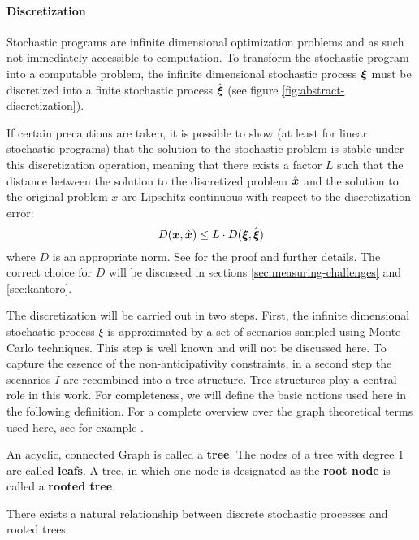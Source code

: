 \paragraph{Discretization}
% 
Stochastic programs are infinite dimensional optimization problems and as such not immediately accessible to computation.
To transform the stochastic program into a computable problem, the infinite dimensional stochastic process $\boldsymbol \xi$ must be discretized into a finite stochastic process $\hat{\boldsymbol\xi}$ (see figure \ref{fig:abstract-discretization}). 

If certain precautions are taken, it is possible to show (at least for linear stochastic programs) that the solution to the stochastic problem is stable under this discretization operation, meaning that there exists a factor $L$ such that the distance between the solution to the discretized problem $\hat{\boldsymbol x}$ and the solution to the original problem $x$ are Lipschitz-continuous with respect to the discretization error:
\begin{equation}
  D(\boldsymbol x , \hat{\boldsymbol x}) \leq L\cdot D(\boldsymbol\xi,\hat{\boldsymbol\xi})
\end{equation}
where $D$ is an appropriate norm. See  for the proof and further details. The correct choice for $D$ will be discussed in sections \ref{sec:measuring-challenges} and \ref{sec:kantoro}.

The discretization will be carried out in two steps. 
First, the infinite dimensional stochastic process $\xi$ is approximated by a set of scenarios sampled using Monte-Carlo techniques. 
This step is well known and will not be discussed here. 
To capture the essence of the non-anticipativity constraints, in a second step the scenarios $I$ are recombined into a tree structure.
Tree structures play a central role in this work.
For completeness, we will define the basic notions used here in the following definition.
For a complete overview over the graph theoretical terms used here, see for example .
\begin{definition}
  An acyclic, connected Graph is called a \textbf{tree}.
  The nodes of a tree with degree 1 are called \textbf{leafs}.
  A tree, in which one node is designated as the \textbf{root node} is called a \textbf{rooted tree}.
\end{definition}
There exists a natural relationship between discrete stochastic processes and rooted trees.
